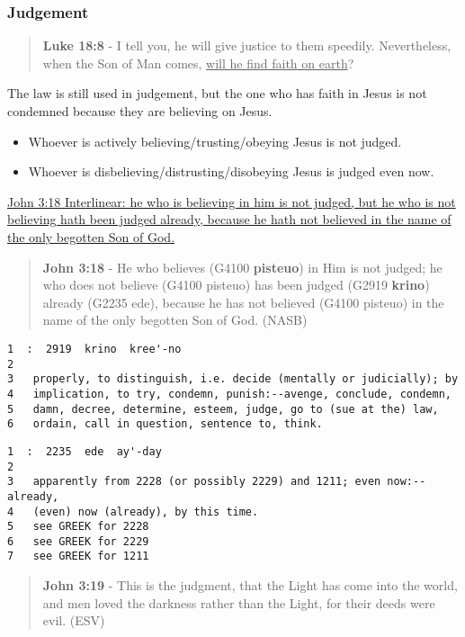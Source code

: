 \documentclass[11pt]{article}
\begin{document}
\subsubsection{Judgement}
\label{sec:org278db9c}
\begin{quote}
\textbf{Luke 18:8} - I tell you, he will give justice to them speedily. Nevertheless, when the Son of Man comes, \uline{will he find faith on earth}?
\end{quote}

The law is still used in judgement, but the one who has faith in Jesus is not condemned because they are believing on Jesus.

\begin{itemize}
\item Whoever is actively believing/trusting/obeying Jesus is not judged.
\item Whoever is disbelieving/distrusting/disobeying Jesus is judged even now.
\end{itemize}

\href{https://biblehub.com/interlinear/john/3-18.htm}{John 3:18 Interlinear: he who is believing in him is not judged, but he who is not believing hath been judged already, because he hath not believed in the name of the only begotten Son of God.}

\begin{quote}
\textbf{John 3:18} - He who believes (G4100 \textbf{pisteuo}) in Him is not judged; he who does not believe (G4100 pisteuo) has been judged (G2919 \textbf{krino}) already (G2235 ede), because he has not believed (G4100 pisteuo) in the name of the only begotten Son of God. (NASB)
\end{quote}

\begin{verbatim}
1  :  2919  krino  kree'-no
2  
3   properly, to distinguish, i.e. decide (mentally or judicially); by
4   implication, to try, condemn, punish:--avenge, conclude, condemn,
5   damn, decree, determine, esteem, judge, go to (sue at the) law,
6   ordain, call in question, sentence to, think.
\end{verbatim}

\begin{verbatim}
1  :  2235  ede  ay'-day
2  
3   apparently from 2228 (or possibly 2229) and 1211; even now:--already,
4   (even) now (already), by this time.
5   see GREEK for 2228
6   see GREEK for 2229
7   see GREEK for 1211
\end{verbatim}

\begin{quote}
\textbf{John 3:19} - This is the judgment, that the Light has come into the world, and men loved the darkness rather than the Light, for their deeds were evil. (ESV)
\end{quote}
\end{document}
